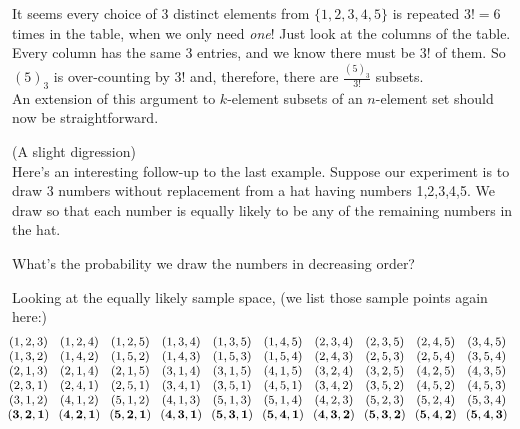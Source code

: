 \documentclass[12pt]{article}
\begin{document}
\noindent It seems every choice of 3 distinct elements from $\{1,2,3,4,5\}$ is repeated $3!=6$ times in the table, when we only need {\em one}!
Just look at the columns of the table. Every column has the same 3 entries, and we know there must be $3!$ of them.
So $(5)_3$ is over-counting by $3!$ and, therefore, there are $\frac {(5)_3}{3!}$ subsets.\\

\noindent An extension of this argument to $k$-element subsets of an $n$-element set should now be straightforward.










\newpage

 (A slight digression)\\
\noindent Here's an interesting follow-up to the last example.
Suppose our experiment is to draw 3 numbers without replacement
from a hat having numbers 1,2,3,4,5. We draw so that each number is equally likely to be any of the remaining numbers in the hat.

\begin{center}What's the probability we draw the numbers in decreasing order?\end{center}

\noindent Looking at the equally likely sample space, (we list those sample points again here:)
$${\small \begin{array}{ccccccccccc}
\!\! \!\! \!\! (1,2,3) & \!\! (1,2,4) & \!\! (1,2,5) & \!\! (1,3,4) & \!\! (1,3,5) & \!\! (1,4,5) & \!\! (2,3,4) & \!\! (2,3,5) & \!\! (2,4,5) & \!\! (3,4,5) \\
\!\! \!\! \!\! (1,3,2) & \!\! (1,4,2) & \!\! (1,5,2) & \!\! (1,4,3) & \!\! (1,5,3) & \!\! (1,5,4) & \!\! (2,4,3) & \!\! (2,5,3) & \!\! (2,5,4) & \!\! (3,5,4) \\
\!\! \!\! \!\! (2,1,3) & \!\! (2,1,4) & \!\! (2,1,5) & \!\! (3,1,4) & \!\! (3,1,5) & \!\! (4,1,5) & \!\! (3,2,4) & \!\! (3,2,5) & \!\! (4,2,5) & \!\! (4,3,5) \\
\!\! \!\! \!\! (2,3,1) & \!\! (2,4,1) & \!\! (2,5,1) & \!\! (3,4,1) & \!\! (3,5,1) & \!\! (4,5,1) & \!\! (3,4,2) & \!\! (3,5,2) & \!\! (4,5,2) & \!\! (4,5,3) \\
\!\! \!\! \!\! (3,1,2) & \!\! (4,1,2) & \!\! (5,1,2) & \!\! (4,1,3) & \!\! (5,1,3) & \!\! (5,1,4) & \!\! (4,2,3) & \!\! (5,2,3) & \!\! (5,2,4) & \!\! (5,3,4) \\
\!\! \!\! \!\! {\bf (3,2,1)} & \!\! {\bf (4,2,1)} & \!\! {\bf (5,2,1)} & \!\! {\bf (4,3,1)} & \!\! {\bf (5,3,1)} & \!\! {\bf (5,4,1)} & \!\! {\bf (4,3,2)} & \!\! {\bf (5,3,2)} & \!\! {\bf (5,4,2)} & \!\! {\bf (5,4,3)} \\
\end{array}}$$
\end{document}

